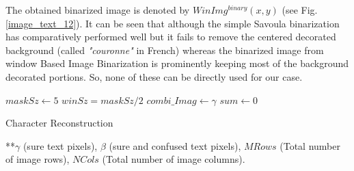 \documentclass[runningheads]{llncs}
\begin{document}
The obtained binarized image is denoted by $WinImg^{binary}(x,y)$ (see Fig. \ref{image_text_12}). It can be seen that although the simple Savoula binarization has comparatively performed well but it fails to remove the centered decorated background (called \textit{"couronne"} in French) whereas the binarized image from window Based Image Binarization is prominently keeping most of the background decorated portions. So, none of these can be directly used for our case.  

\begin{algorithm}[bht!] 
	\LinesNumbered
	\DontPrintSemicolon
	$maskSz \gets 5$  \; 
	$winSz = maskSz/2$\;
	$combi\_Imag \gets \gamma$ \; 
	$sum \gets 0$ \; 
	 {
		 {
			\vspace{-0mm}
		}
	}
	\caption{\sc Character Reconstruction}
	\label{algo:pixelReconstruc}
	**$\gamma$ (sure text pixels), $\beta$ (sure and confused text pixels), $MRows$ (Total number of image rows), $NCols$ (Total number of image columns).
\end{algorithm} 
\end{document}
